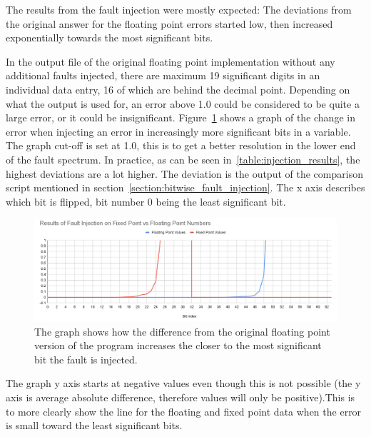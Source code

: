 
The results from the fault injection were mostly expected: The deviations from the original answer for the floating point errors started low, then increased exponentially towards the most significant bits.

In the output file of the original floating point implementation without any additional faults injected, there are maximum 19 significant digits in an individual data entry, 16 of which are behind the decimal point. Depending on what the output is used for, an error above 1.0 could be considered to be quite a large error, or it could be insignificant. Figure~\ref{fig:graph_fixed_vs_float_error} shows a graph of the change in error when injecting an error in increasingly more significant bits in a variable. The graph cut-off is set at 1.0, this is to get a better resolution in the lower end of the fault spectrum. In practice, as can be seen in~\ref{table:injection_results}, the highest deviations are a lot higher. The deviation is the output of the comparison script mentioned in section~\ref{section:bitwise_fault_injection}. The x axis describes which bit is flipped, bit number 0 being the least significant bit.

\begin{figure}[h!]
    \centering
    \includegraphics[width=\linewidth]{Images/graph_float_vs_fixed_fault_injection_results.png}
    \caption{The graph shows how the difference from the original floating point version of the program increases the closer to the most significant bit the fault is injected. }
    \label{fig:graph_fixed_vs_float_error}
\end{figure}


The graph y axis starts at negative values even though this is not possible (the y axis is average absolute difference, therefore values will only be positive).This is to more clearly show the line for the floating and fixed point data when the error is small toward the least significant bits.


